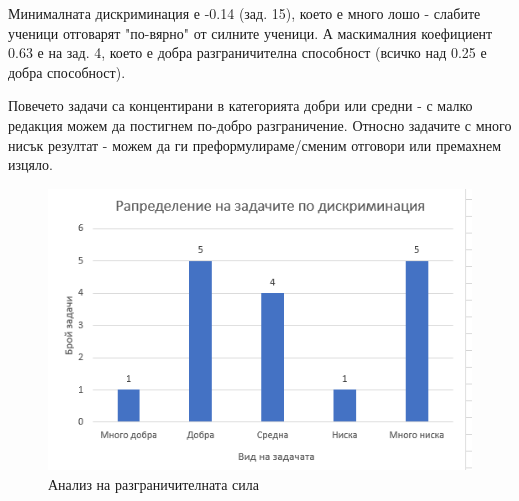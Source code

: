 Минималната дискриминация е -0.14 (зад. 15), което е много лошо - слабите ученици отговарят "по-вярно"  от силните ученици. А маскималния коефициент 0.63 е на зад. 4, което е добра разграничителна способност (всичко над 0.25 е добра способност).

Повечето задачи са концентирани в категорията добри или средни - с малко редакция можем да постигнем по-добро разграничение. Относно задачите с много нисък резултат - можем да ги преформулираме/сменим отговори или премахнем изцяло.
\begin{figure}[H]
    \centering
    \includegraphics[width=\linewidth]{resources/diskrimination.png}
    \caption{Анализ на разграничителната сила}
\end{figure}

